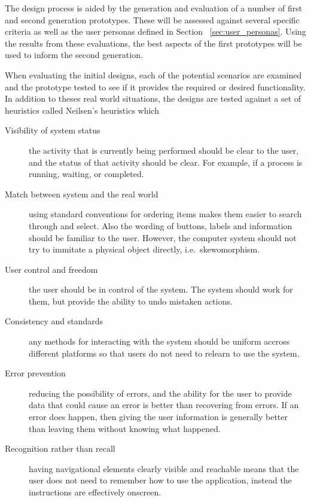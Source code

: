 The design process is aided by the generation and evaluation of a number of
first and second generation prototypes. These will be assessed against several
specific criteria as well as the user personas defined in Section~%
\ref{sec:user_personas}. Using the results from these evaluations, the
best aspects of the first prototypes will be used to inform the second
generation.

When evaluating the initial designs, each of the potential scenarios are
examined and the prototype tested to see if it provides the required or desired
functionality. In addition to theses real world situations, the designs are
tested against a set of heuristics called Neilsen’s heuristics which

\begin{description}

	\item[Visibility of system status] the activity that is currently being
		performed should be clear to the user, and the status of that activity
		should be clear. For example, if a process is running, waiting, or
		completed.

	\item[Match between system and the real world] using standard conventions
		for ordering items makes them easier to search through and select. Also
		the wording of buttons, labels and information should be familiar to
		the user. However, the computer system should not try to immitate a
		physical object directly, i.e.\ skewomorphism.

	\item[User control and freedom] the user should be in control of the
		system. The system should work for them, but provide the ability to
		undo mistaken actions.

	\item[Consistency and standards] any methods for interacting with the
		system should be uniform accross different platforms so that users do
		not need to relearn to use the system.

	\item[Error prevention] reducing the possibility of errors, and the ability
		for the user to provide data that could cause an error is better than
		recovering from errors. If an error does happen, then giving the user
		information is generally better than leaving them without knowing what
		happened.

	\item[Recognition rather than recall] having navigational elements clearly
		visible and reachable means that the user does not need to remember how
		to use the application, instead the instructions are effectively
		onscreen.


\end{description}
